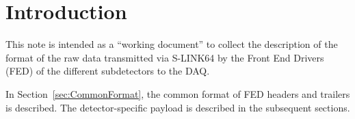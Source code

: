 \section{Introduction}\label{sec:Introduction}

This note is intended as a ``working document'' to collect the
description of the format of the raw data transmitted via S-LINK64 by
the Front End Drivers (FED) of the different subdetectors to the DAQ.

In Section~\ref{sec:CommonFormat}, the common format of FED headers
and trailers is described. The detector-specific payload is described
in the subsequent sections.
 

